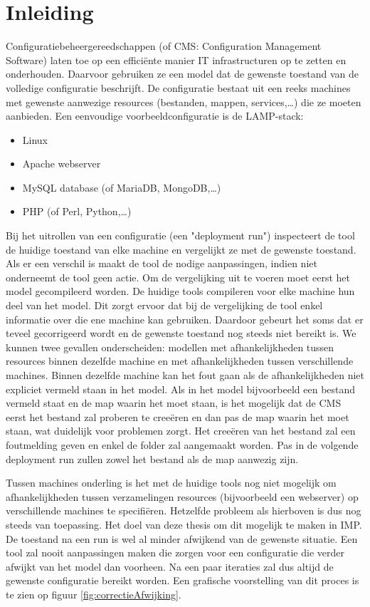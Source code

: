 \chapter{Inleiding}
\label{inleiding}
Configuratiebeheergereedschappen (of CMS: Configuration Management Software) laten toe op een effici\"ente manier IT infrastructuren op te zetten en onderhouden.
Daarvoor gebruiken ze een model dat de gewenste toestand van de volledige configuratie beschrijft.
De configuratie bestaat uit een reeks machines met gewenste aanwezige resources (bestanden, mappen, services,\ldots) die ze moeten aanbieden.
Een eenvoudige voorbeeldconfiguratie is de LAMP-stack: 
\begin{itemize}
  \item Linux
  \item Apache webserver
  \item MySQL database (of MariaDB, MongoDB,\ldots)
  \item PHP (of Perl, Python,\ldots)
\end{itemize}

Bij het uitrollen van een configuratie (een "deployment run") inspecteert de tool de huidige toestand van elke machine en vergelijkt ze met de gewenste toestand.
Als er een verschil is maakt de tool de nodige aanpassingen, indien niet onderneemt de tool geen actie.
Om de vergelijking uit te voeren moet eerst het model gecompileerd worden.
De huidige tools compileren voor elke machine hun deel van het model.
Dit zorgt ervoor dat bij de vergelijking de tool enkel informatie over die ene machine kan gebruiken.
Daardoor gebeurt het soms dat er teveel gecorrigeerd wordt en de gewenste toestand nog steeds niet bereikt is.
We kunnen twee gevallen onderscheiden: modellen met afhankelijkheden tussen resources binnen dezelfde machine en met afhankelijkheden tussen verschillende machines.
Binnen dezelfde machine kan het fout gaan als de afhankelijkheden niet expliciet vermeld staan in het model. 
Als in het model bijvoorbeeld een bestand vermeld staat en de map waarin het moet staan, is het mogelijk dat de CMS eerst het bestand zal
proberen te cree\"eren en dan pas de map waarin het moet staan, wat duidelijk voor problemen zorgt.
Het cree\"eren van het bestand zal een foutmelding geven en enkel de folder zal aangemaakt worden.
Pas in de volgende deployment run zullen zowel het bestand als de map aanwezig zijn.

Tussen machines onderling is het met de huidige tools nog niet mogelijk om afhankelijkheden tussen verzamelingen resources (bijvoorbeeld een
webserver) op verschillende machines te specifi\"eren. 
Hetzelfde probleem als hierboven is dus nog steeds van toepassing. 
Het doel van deze thesis om dit mogelijk te maken in IMP.
De toestand na een run is wel al minder afwijkend van de gewenste situatie.
Een tool zal nooit aanpassingen maken die zorgen voor een configuratie die verder afwijkt van het model dan voorheen.
Na een paar iteraties zal dus altijd de gewenste configuratie bereikt worden.
Een grafische voorstelling van dit proces is te zien op figuur \ref{fig:correctieAfwijking}.

